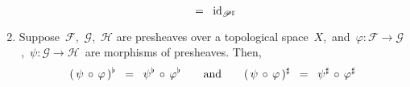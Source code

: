 \begin{theorem}
\begin{enumerate}
\begin{equation*}
	\;\; = \;\;
		\textnormal{id}_{\mathscr{P}^{\sharp}}
	\end{equation*}
\item
	Suppose \,$\mathscr{F}$, \,$\mathscr{G}$, \,$\mathscr{H}$ are presheaves over a topological space \,$X$,\,
	and
	\,$\varphi : \mathscr{F} \longrightarrow \mathscr{G}$\,,
	\,$\psi : \mathscr{G} \longrightarrow \mathscr{H}$\,
	are morphisms of presheaves.
	Then,
	\begin{equation*}
	(\,\psi \,\circ\, \varphi\,)^{\flat}
	\;\; = \;\;
		\psi^{\flat} \,\circ\, \varphi^{\flat}
	\quad\quad\textnormal{and}\quad\quad
	(\,\psi \,\circ\, \varphi\,)^{\sharp}
	\;\; = \;\;
		\psi^{\sharp} \,\circ\, \varphi^{\sharp}
	\end{equation*}
\end{enumerate}
\end{theorem}


